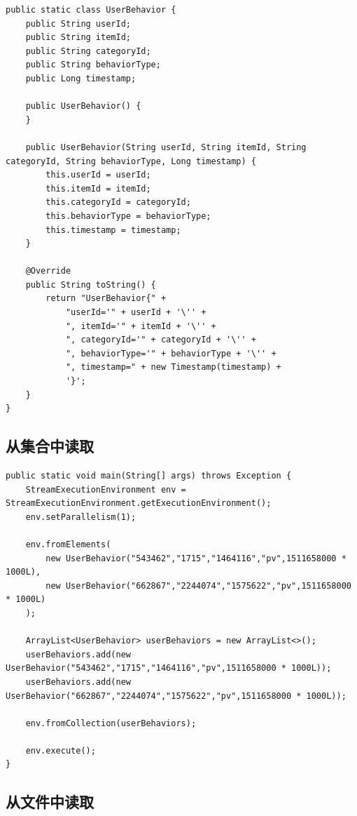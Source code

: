 \documentclass[cn,11pt,chinese]{elegantbook}
\begin{document}
\begin{verbatim}
public static class UserBehavior {
    public String userId;
    public String itemId;
    public String categoryId;
    public String behaviorType;
    public Long timestamp;
    
    public UserBehavior() {
    }
    
    public UserBehavior(String userId, String itemId, String categoryId, String behaviorType, Long timestamp) {
        this.userId = userId;
        this.itemId = itemId;
        this.categoryId = categoryId;
        this.behaviorType = behaviorType;
        this.timestamp = timestamp;
    }
    
    @Override
    public String toString() {
        return "UserBehavior{" +
            "userId='" + userId + '\'' +
            ", itemId='" + itemId + '\'' +
            ", categoryId='" + categoryId + '\'' +
            ", behaviorType='" + behaviorType + '\'' +
            ", timestamp=" + new Timestamp(timestamp) +
            '}';
    }
}
\end{verbatim}

\subsection{从集合中读取}

\begin{verbatim}
public static void main(String[] args) throws Exception {
    StreamExecutionEnvironment env = StreamExecutionEnvironment.getExecutionEnvironment();
    env.setParallelism(1);
    
    env.fromElements(
        new UserBehavior("543462","1715","1464116","pv",1511658000 * 1000L),
        new UserBehavior("662867","2244074","1575622","pv",1511658000 * 1000L)
    );
    
    ArrayList<UserBehavior> userBehaviors = new ArrayList<>();
    userBehaviors.add(new UserBehavior("543462","1715","1464116","pv",1511658000 * 1000L));
    userBehaviors.add(new UserBehavior("662867","2244074","1575622","pv",1511658000 * 1000L));
    
    env.fromCollection(userBehaviors);
    
    env.execute();
}
\end{verbatim}

\subsection{从文件中读取}
\end{document}
